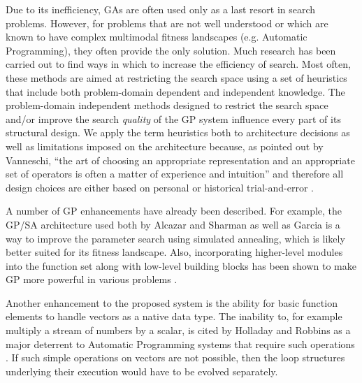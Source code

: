 \documentclass[a4paper,12pt]{report} 	%
\numberwithin{figure}{chapter}
\numberwithin{table}{chapter}
\numberwithin{equation}{chapter}
\begin{document}
\begin{flushleft}
Due to its inefficiency, GAs are often used only as a last resort in search problems. However, for problems that are not well understood or which are known to have complex multimodal fitness landscapes (e.g. Automatic Programming), they often provide the only solution. Much research has been carried out to find ways in which to increase the efficiency of search. Most often, these methods are aimed at restricting the search space using a set of heuristics that include both problem-domain dependent and independent knowledge. The problem-domain independent methods designed to restrict the search space and/or improve the search \emph{quality} of the GP system influence every part of its structural design. We apply the term heuristics both to architecture decisions as well as limitations imposed on the architecture because, as pointed out by Vanneschi, ``the art of choosing an appropriate representation and an appropriate set of operators is often a matter of experience and intuition'' and therefore all design choices are either based on personal or historical trial-and-error \cite[p. 6]{Vanneschi:2004le}.

A number of GP enhancements have already been described. For example, the GP/SA architecture used both by Alcazar and Sharman \cite{Alcazar:1996la} as well as Garcia \cite{Garcia:2002cq} is a way to improve the parameter search using simulated annealing, which is likely better suited for its fitness landscape. Also, incorporating higher-level modules into the function set along with low-level building blocks has been shown to make GP more powerful in various problems \cite{Koza:1997zr}. 

Another enhancement to the proposed system is the ability for basic function elements to handle vectors as a native data type. The inability to, for example multiply a stream of numbers by a scalar, is cited by Holladay and Robbins as a major deterrent to Automatic Programming systems that require such operations \cite[p. 1]{Holladay:2007ct}. If such simple operations on vectors are not possible, then the loop structures underlying their execution would have to be evolved separately.


\end{flushleft}
\end{document}
